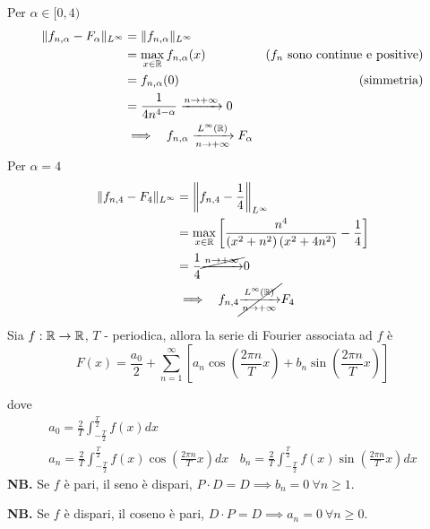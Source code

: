 \begin{enumerate}
Per $\alpha \in [ 0,4)$\begin{equation*}
\begin{aligned}
\Vert f_{n,\alpha } - F_{\alpha }\Vert _{L^{\infty }} & = \Vert f_{n,\alpha }\Vert _{L^{\infty }} & \\
 & = \max_{x\in \mathbb{R} } f_{n,\alpha }(x) & \left(f_{n} \ \text{sono continue e positive}\right)\\
 & = f_{n,\alpha }(0) & \text{(simmetria)}\\
 & = \frac{1}{4n^{4 - \alpha }}\xrightarrow{n\rightarrow + \infty } 0 & \\
 & \implies \ \ f_{n,\alpha }\xrightarrow[n\rightarrow + \infty ]{L^{\infty }(\mathbb{R})} F_{\alpha } & 
\end{aligned}
\end{equation*}Per $\alpha = 4$\begin{equation*}
\begin{aligned}
\Vert f_{n,4} - F_{4}\Vert _{L^{\infty }} & = \left\Vert f_{n,4} - \frac{1}{4}\right\Vert _{L^{\infty }}\\
 & = \max_{x\in \mathbb{R} }\left[\frac{n^{4}}{\left(x^{2} + n^{2}\right)\left(x^{2} + 4n^{2}\right)} - \frac{1}{4}\right]\\
 & = \frac{1}{4}\cancel{\xrightarrow{n\rightarrow + \infty }} 0\\
 & \implies \ \ f_{n,4}\cancel{\xrightarrow[n\rightarrow + \infty ]{L^{\infty }(\mathbb{R})}} F_{4}
\end{aligned}
\end{equation*}
\end{enumerate}
\Soluzione
\begin{thm}
Sia $f:\mathbb{R} \rightarrow \mathbb{R} $, $T$ - periodica, allora la serie di Fourier associata ad $f$ è\begin{equation*}
F(x) = \frac{a_{0}}{2} + \sum\limits ^{\infty }_{n = 1}\left[ a_{n}\cos\left(\frac{2\pi n}{T} x\right) + b_{n}\sin\left(\frac{2\pi n}{T} x\right)\right]
\end{equation*}

dove
\begin{gather*}
a_{0} = \frac{2}{T}\int ^{\frac{T}{2}}_{ - \frac{T}{2}} f(x) dx\\
a_{n} = \frac{2}{T}\int ^{\frac{T}{2}}_{ - \frac{T}{2}} f(x)\cos\left(\frac{2\pi n}{T} x\right) dx\ \ \ \ b_{n} = \frac{2}{T}\int ^{\frac{T}{2}}_{ - \frac{T}{2}} f(x)\sin\left(\frac{2\pi n}{T} x\right) dx
\end{gather*}
\textbf{NB.} Se $f$ è pari, il seno è dispari, $P\cdot D = D\implies b_{n} = 0\ \forall n\geqslant 1$.

\textbf{NB.} Se $f$ è dispari, il coseno è pari, $D\cdot P = D\implies a_{n} = 0\ \forall n\geqslant 0$.
\end{thm}
